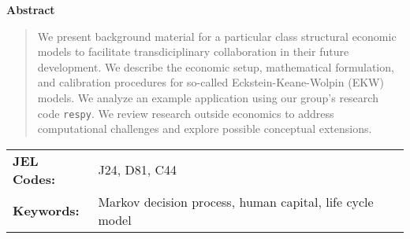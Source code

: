 
\maketitle


\vspace{0.5cm}
\renewcommand{\baselinestretch}{1.3}\normalsize

\setcounter{page}{1}
\thispagestyle{empty}

\begin{center}\textbf{Abstract}\end{center}
\begin{abstract}
\noindent We present background material for a particular class structural economic models to facilitate transdiciplinary collaboration in their future development. We describe the economic setup, mathematical formulation, and calibration procedures for so-called Eckstein-Keane-Wolpin (EKW) models. We analyze an example application using our group's research code \verb+respy+. We review research outside economics to address computational challenges and explore possible conceptual extensions.\\\newline
\end{abstract}

\noindent\begin{tabular}{@{\hspace{0.5cm}}ll}
\textbf{JEL Codes:} & J24, D81, C44\\
\textbf{Keywords:}  & Markov decision process, human capital, life cycle model\\
\end{tabular}

\setcounter{page}{1}
\thispagestyle{empty}

\newpage
\tableofcontents
\newpage
